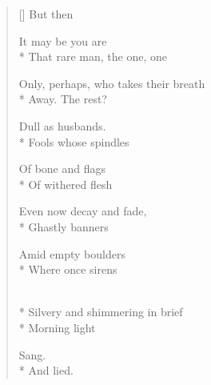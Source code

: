 \label{ch:lear_am}
\settowidth{\versewidth}{Only, perhaps, who takes their breath}
\begin{verse}[\versewidth]
\hspace*{3\vgap} But then

It may be you are\\*
That rare man, the one, one

Only, perhaps, who takes their breath\\*
Away.     The rest?

Dull as husbands.\\*
Fools whose spindles

Of bone and flags\\*
Of withered flesh

Even now decay and fade,\\*
Ghastly banners

Amid empty boulders\\*
Where once sirens

\\*
Silvery and shimmering in brief\\*
Morning light

Sang.\\*
And lied.
\end{verse}
